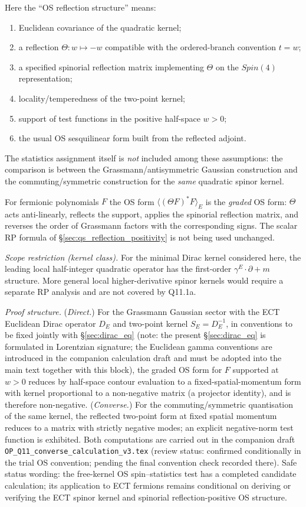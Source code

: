 Here the ``OS reflection structure'' means:
\begin{enumerate}[label=(\roman*)]
  \item Euclidean covariance of the quadratic kernel;
  \item a reflection $\Theta:w\mapsto-w$ compatible with the
    ordered-branch convention $t=w$;
  \item a specified spinorial reflection matrix implementing
    $\Theta$ on the $Spin(4)$ representation;
  \item locality/temperedness of the two-point kernel;
  \item support of test functions in the positive half-space $w>0$;
  \item the usual OS sesquilinear form built from the reflected
    adjoint.
\end{enumerate}
The statistics assignment itself is \emph{not} included among these
assumptions: the comparison is between the Grassmann/antisymmetric
Gaussian construction and the commuting/symmetric construction for
the \emph{same} quadratic spinor kernel.

For fermionic polynomials $F$ the OS form
$\langle(\Theta F)^{*}F\rangle_E$ is the \emph{graded} OS form:
$\Theta$ acts anti-linearly, reflects the support, applies the
spinorial reflection matrix, and reverses the order of Grassmann
factors with the corresponding signs.
The scalar RP formula of
\S\ref{sec:qs_reflection_positivity} is not being used unchanged.

\emph{Scope restriction (kernel class).}
For the minimal Dirac kernel considered here, the leading local
half-integer quadratic operator has the first-order
$\gamma^E\!\cdot\!\partial+m$ structure.
More general local higher-derivative spinor kernels would require a
separate RP analysis and are not covered by Q11.1a.

\emph{Proof structure.}
(\emph{Direct.})
For the Grassmann Gaussian sector with the ECT Euclidean Dirac
operator $D_E$ and two-point kernel $S_E=D_E^{-1}$, in conventions
to be fixed jointly with \S\ref{sec:dirac_eq} (note: the present
\S\ref{sec:dirac_eq} is formulated in Lorentzian signature; the
Euclidean gamma conventions are introduced in the companion
calculation draft and must be adopted into the main text together
with this block), the graded OS form for $F$ supported at $w>0$
reduces by half-space contour evaluation to a fixed-spatial-momentum
form with kernel proportional to a non-negative matrix (a projector
identity), and is therefore non-negative.
(\emph{Converse.})
For the commuting/symmetric quantisation of the same kernel, the
reflected two-point form at fixed spatial momentum reduces to a
matrix with strictly negative modes; an explicit negative-norm test
function is exhibited.
Both computations are carried out in the companion draft
\texttt{OP\_Q11\_converse\_calculation\_v3.tex} (review status:
confirmed conditionally in the trial OS convention; pending the
final convention check recorded there).
Safe status wording: the free-kernel OS spin--statistics test has
a completed candidate calculation; its application to ECT fermions
remains conditional on deriving or verifying the ECT spinor kernel
and spinorial reflection-positive OS structure.


